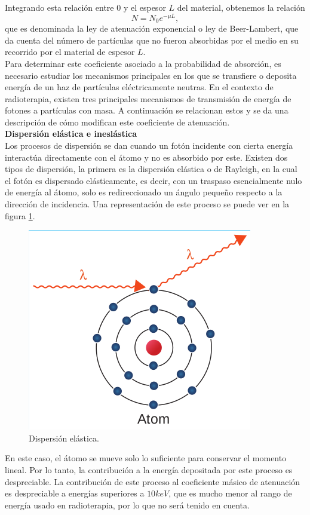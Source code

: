 Integrando esta relación entre $0$ y el espesor $L$ del material, obtenemos la relación
\begin{equation}
	N=N_0 e^{-\mu L},
\end{equation}
que es denominada la ley de atenuación exponencial o ley de Beer-Lambert\cite{Attix1986}, que da cuenta del número de partículas que no fueron absorbidas por el medio en su recorrido por el material de espesor $L$.\\

Para determinar este coeficiente asociado a la probabilidad de absorción, es necesario estudiar los mecanismos principales en los que se transfiere o deposita energía de un haz de partículas eléctricamente neutras. En el contexto de radioterapia, existen tres principales mecanismos de transmisión de energía  de fotones a partículas con masa. A continuación se relacionan estos y se da una descripción de cómo modifican este coeficiente de atenuación.\\

\noindent
\textbf{Dispersión elástica e ineslástica}\\

Los procesos de dispersión se dan cuando un fotón incidente con cierta energía interactúa directamente con el átomo y no es absorbido por este. Existen dos tipos de dispersión, la primera es la dispersión elástica o de Rayleigh, en la cual el fotón es dispersado elásticamente, es decir, con un traspaso esencialmente nulo de energía al átomo, solo es redireccionado un ángulo pequeño respecto a la dirección de incidencia. Una representación de este proceso se puede ver en la figura \ref{fig:rayleigh}.\\
\begin{figure}[H]
	\centering
	\includegraphics[width=0.7\linewidth]{images/rayleigh.png}
	\caption{Dispersión elástica\cite{khan2014the}.}
	\label{fig:rayleigh}
\end{figure}
En este caso, el átomo se mueve solo lo suficiente para conservar el momento lineal. Por lo tanto, la contribución a la energía depositada por este proceso es despreciable. La contribución de este proceso al coeficiente másico de atenuación es despreciable a energías superiores a $10 keV$, que es mucho menor al rango de energía usado en radioterapia, por lo que no será tenido en cuenta.  \\

